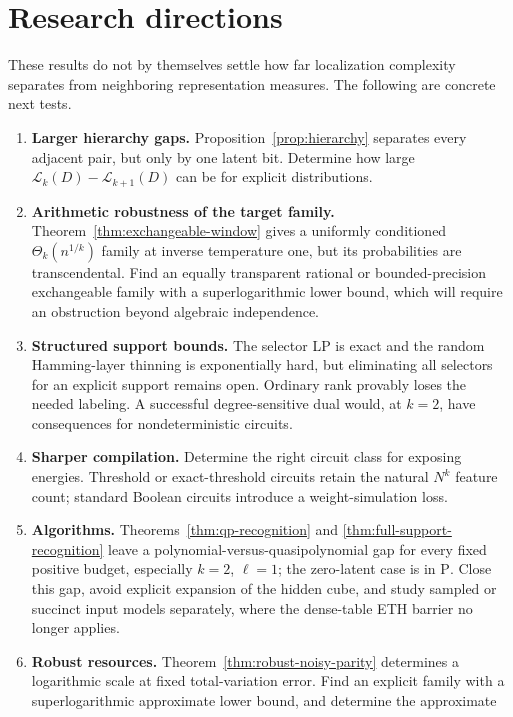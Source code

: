 \documentclass{article}
\newcommand{\LC}{\mathcal{L}}
\begin{document}
\section{Research directions}\label{sec:directions}

These results do not by themselves settle how far localization complexity
separates from neighboring representation measures.  The following are
concrete next tests.

\begin{enumerate}
  \item \textbf{Larger hierarchy gaps.}  Proposition~\ref{prop:hierarchy}
  separates every adjacent pair, but only by one latent bit.  Determine how
  large $\LC_k(D)-\LC_{k+1}(D)$ can be for explicit distributions.
  \item \textbf{Arithmetic robustness of the target family.}
  Theorem~\ref{thm:exchangeable-window} gives a uniformly conditioned
  $\Theta_k(n^{1/k})$ family at inverse temperature one, but its probabilities
  are transcendental.  Find an equally transparent rational or bounded-precision
  exchangeable family with a superlogarithmic lower bound, which will require
  an obstruction beyond algebraic independence.
  \item \textbf{Structured support bounds.}  The selector LP is exact and the
  random Hamming-layer thinning is exponentially hard, but eliminating all
  selectors for an explicit support remains open.  Ordinary rank provably
  loses the needed labeling.  A successful degree-sensitive dual would, at
  $k=2$, have consequences for nondeterministic circuits.
  \item \textbf{Sharper compilation.}  Determine the right circuit class for
  exposing energies.  Threshold or exact-threshold circuits retain the natural
  $N^k$ feature count; standard Boolean circuits introduce a weight-simulation
  loss.
  \item \textbf{Algorithms.}  Theorems~\ref{thm:qp-recognition} and
  \ref{thm:full-support-recognition} leave a polynomial-versus-quasipolynomial
  gap for every fixed positive budget, especially $k=2$, $\ell=1$; the
  zero-latent case is in $\mathrm P$.  Close this gap, avoid explicit expansion
  of the hidden cube, and study sampled or succinct input models separately,
  where the dense-table ETH barrier no longer applies.
  \item \textbf{Robust resources.}
  Theorem~\ref{thm:robust-noisy-parity} determines a logarithmic scale at
  fixed total-variation error.  Find an explicit family with a
  superlogarithmic approximate lower bound, and determine the approximate

\end{enumerate}
\end{document}
